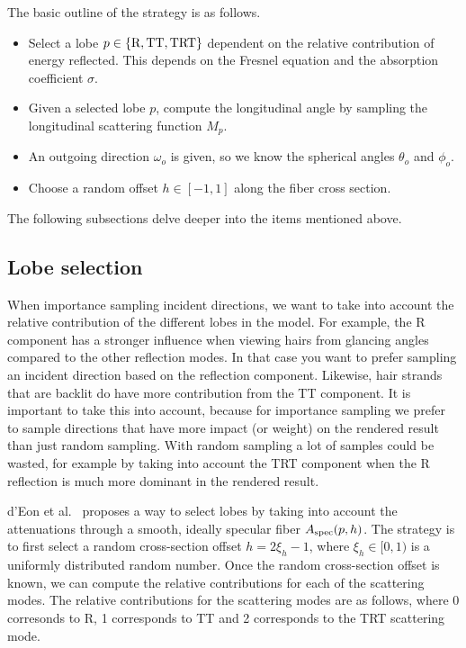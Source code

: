 \documentclass[11pt,a4paper]{report}
\begin{document}
The basic outline of the strategy is as follows.

\begin{itemize}
\item Select a lobe $p \in \{ \textnormal{R}, \textnormal{TT}, \textnormal{TRT} \}$ dependent on the relative contribution of energy reflected. This depends on the Fresnel equation and the absorption coefficient $\sigma$.
\item Given a selected lobe $p$, compute the longitudinal angle by sampling the longitudinal scattering function $M_p$.
\item An outgoing direction $\omega_o$ is given, so we know the spherical angles $\theta_o$ and $\phi_o$.
\item Choose a random offset $h \in [-1, 1]$ along the fiber cross section.
\end{itemize}

The following subsections delve deeper into the items mentioned above.

\subsection{Lobe selection}
\label{sec_lobe_selection}

When importance sampling incident directions, we want to take into account the relative contribution of the different lobes in the model. For example, the R component has a stronger influence when viewing hairs from glancing angles compared to the other reflection modes. In that case you want to prefer sampling an incident direction based on the reflection component. Likewise, hair strands that are backlit do have more contribution from the TT component. It is important to take this into account, because for importance sampling we prefer to sample directions that have more impact (or weight) on the rendered result than just random sampling. With random sampling a lot of samples could be wasted, for example by taking into account the TRT component when the R reflection is much more dominant in the rendered result.

d'Eon et al.~\cite{eon2013} proposes a way to select lobes by taking into account the attenuations through a smooth, ideally specular fiber $A_{\textnormal{spec}}(p, h)$. The strategy is to first select a random cross-section offset $h = 2\xi_h - 1$,  where $\xi_h \in [0, 1)$ is a uniformly distributed random number. Once the random cross-section offset is known, we can compute the relative contributions for each of the scattering modes. The relative contributions for the scattering modes are as follows, where 0 corresonds to R, 1 corresponds to TT and 2 corresponds to the TRT scattering mode.
\end{document}
